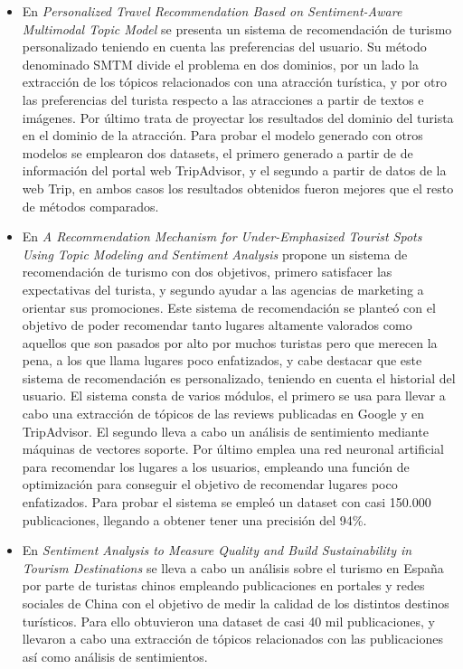 \begin{itemize}
    \item En \textit{Personalized Travel Recommendation Based on
Sentiment-Aware Multimodal Topic Model} se presenta un sistema de recomendación de turismo personalizado teniendo en cuenta las preferencias del usuario. Su método denominado SMTM divide el problema en dos dominios, por un lado la extracción de los tópicos relacionados con una atracción turística, y por otro las preferencias del turista respecto a las atracciones a partir de textos e imágenes. Por último trata de proyectar los resultados del dominio del turista en el dominio de la atracción. Para probar el modelo generado con otros modelos se emplearon dos datasets, el primero generado a partir de de información del portal web TripAdvisor, y el segundo a partir de datos de la web Trip, en ambos casos los resultados obtenidos fueron mejores que el resto de métodos comparados.

    \item En \textit{A Recommendation Mechanism for
Under-Emphasized Tourist Spots Using Topic
Modeling and Sentiment Analysis} propone un sistema de recomendación de turismo con dos objetivos, primero satisfacer las expectativas del turista, y segundo ayudar a las agencias de marketing a orientar sus promociones. Este sistema de recomendación se planteó con el objetivo de poder recomendar tanto lugares altamente valorados como aquellos que son pasados por alto por muchos turistas pero que merecen la pena, a los que llama lugares poco enfatizados, y cabe destacar que este sistema de recomendación es personalizado, teniendo en cuenta el historial del usuario. El sistema consta de varios módulos, el primero se usa para llevar a cabo una extracción de tópicos de las reviews publicadas en Google y en TripAdvisor. El segundo lleva a cabo un análisis de sentimiento mediante máquinas de vectores soporte. Por último emplea una red neuronal artificial para recomendar los lugares a los usuarios, empleando una función de optimización para conseguir el objetivo de recomendar lugares poco enfatizados. Para probar el sistema se empleó un dataset con casi 150.000 publicaciones, llegando a obtener tener una precisión del 94\%.

    \item En \textit{Sentiment Analysis to Measure Quality and Build
Sustainability in Tourism Destinations} se lleva a cabo un análisis sobre el turismo en España por parte de turistas chinos empleando publicaciones en portales y redes sociales de China con el objetivo de medir la calidad de los distintos destinos turísticos. Para ello obtuvieron una dataset de casi 40 mil publicaciones, y llevaron a cabo una extracción de tópicos relacionados con las publicaciones así como análisis de sentimientos.
\end{itemize}
